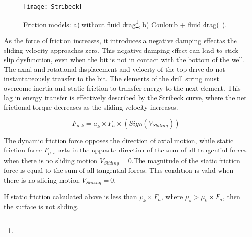 \begin{figure}
  \centering
  \texttt{[image: Stribeck]}
  \caption[Comparison of friction models]{Friction models: a) without fluid drag\footnote{}, b) Coulomb + fluid drag\footnotemark[\value{footnote}] (~\cite{ref:cayeux2020a}). }
  \label{Friction models}
\end{figure}

As the force of friction increases, it introduces a negative damping effect\needsclarification[How so?]as the sliding velocity approaches zero. This negative damping effect can lead to stick-slip dysfunction, even when the bit is not in contact with the bottom of the well. The axial and rotational displacement and velocity of the top drive do not instantaneously transfer to the bit. The elements of the drill string must overcome inertia and static friction to transfer energy to the next element. This lag in energy transfer is effectively described by the Stribeck curve, where the net frictional torque decreases as the sliding velocity increases.

\begin{equation}\label{dyanmic_force}
  F_{\mu,k} = \mu_{k}\times F_{n} \times (Sign(V_{Sliding}))
\end{equation}

The dynamic friction force opposes the direction of axial motion, while static friction force $F_{\mu,s}$ acts in the opposite direction of the sum of all tangential forces when there is no sliding motion $V_{Sliding}=0$.The magnitude of the static friction force is equal to the sum of all tangential forces. This condition is valid when there is no sliding motion $V_{Sliding}=0$.

If static friction calculated above is less than $\mu_{k}\times F_{n}$, where $\mu_{s} > \mu_{k}\times F_{n}$, then the surface is not sliding.


